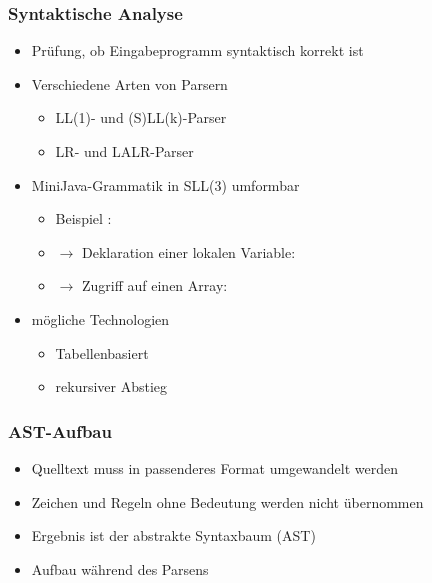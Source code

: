\begin{frame}
    \frametitle{Syntaktische Analyse}
    \begin{itemize}
    \item Prüfung, ob Eingabeprogramm syntaktisch korrekt ist
    \item Verschiedene Arten von Parsern
    	\begin{itemize}
    	\item LL(1)- und (S)LL(k)-Parser
    	\item LR- und LALR-Parser
    	\end{itemize}
    \item MiniJava-Grammatik in SLL(3) umformbar \pause
    \begin{itemize}
    	\item Beispiel \code{a[}:
    	\item[] $\rightarrow$ Deklaration einer lokalen Variable: 
    	\item[] $\rightarrow$ Zugriff auf einen Array: 
    \end{itemize} \pause
    \item mögliche Technologien
	    \begin{itemize}
		\item Tabellenbasiert
		\item rekursiver Abstieg
    	\end{itemize}
    \end{itemize}
\end{frame}

\begin{frame}
	\frametitle{AST-Aufbau}
	\begin{itemize}
	\item Quelltext muss in passenderes Format umgewandelt werden
	\item Zeichen und Regeln ohne Bedeutung werden nicht übernommen
	\item Ergebnis ist der abstrakte Syntaxbaum (AST)
	\item Aufbau während des Parsens
	\end{itemize}
\end{frame}

